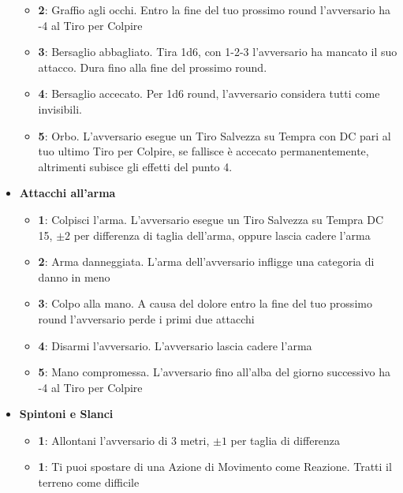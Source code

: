 \begin{multicols}{2}
\begin{itemize}[leftmargin=*]
\begin{itemize}[leftmargin=*]
		\item \textbf{2}: Graffio agli occhi. Entro la fine del tuo prossimo round l'avversario ha -4 al Tiro per Colpire

		\item \textbf{3}: Bersaglio abbagliato. Tira 1d6, con 1-2-3 l'avversario ha mancato il suo attacco. Dura fino alla fine del prossimo round.

		\item \textbf{4}: Bersaglio accecato. Per 1d6 round, l'avversario considera tutti come invisibili.

		\item \textbf{5}: Orbo. L'avversario esegue un Tiro Salvezza su Tempra con DC pari al tuo ultimo Tiro per Colpire, se fallisce è accecato permanentemente, altrimenti subisce gli effetti del punto 4.
	\end{itemize}

	\item \textbf{Attacchi all'arma}
	\begin{itemize}[leftmargin=*]
		\setlength{\itemsep}{0pt}
		\item \textbf{1}: Colpisci l'arma. L'avversario esegue un Tiro Salvezza su Tempra DC 15, $ \pm 2 $ per differenza di taglia dell'arma, oppure lascia cadere l'arma

		\item \textbf{2}: Arma danneggiata. L'arma dell'avversario infligge una categoria di danno in meno

		\item \textbf{3}: Colpo alla mano. A causa del dolore entro la fine del tuo prossimo round l'avversario perde i primi due attacchi

		\item \textbf{4}: Disarmi l'avversario. L'avversario lascia cadere l'arma

		\item \textbf{5}: Mano compromessa. L'avversario fino all'alba del giorno successivo ha -4 al Tiro per Colpire
	\end{itemize}

	\item \textbf{Spintoni e Slanci}
	\begin{itemize}[leftmargin=*]
		\setlength{\itemsep}{0pt}
		\item \textbf{1}: Allontani l'avversario di 3 metri, $ \pm 1$ per taglia di differenza

		\item \textbf{1}: Ti puoi spostare di una Azione di Movimento come Reazione. Tratti il terreno come difficile


\end{itemize}
\end{itemize}
\end{multicols}
